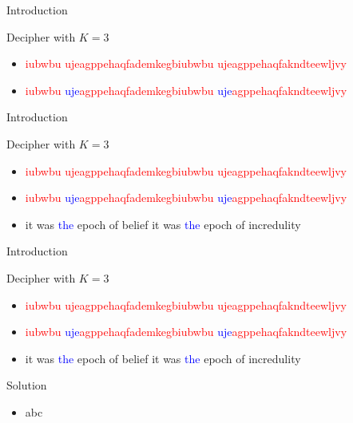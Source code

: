\documentclass{beamer}
\begin{document}
\begin{frame}{Introduction}

\begin{block}{Decipher with $K=3$}
\begin{itemize}
\item \textcolor{red}{iubwbu ujeagppehaqfademkegbiubwbu ujeagppehaqfakndteewljvy}
\item \textcolor{red}{iubwbu }\textcolor{blue}{uje}\textcolor{red}{agppehaqfademkegbiubwbu }\textcolor{blue}{uje}\textcolor{red}{agppehaqfakndteewljvy}
\end{itemize}
\end{block}

\end{frame}
  

\begin{frame}{Introduction}

\begin{block}{Decipher with $K=3$}
\begin{itemize}
\item \textcolor{red}{iubwbu ujeagppehaqfademkegbiubwbu ujeagppehaqfakndteewljvy}
\item \textcolor{red}{iubwbu }\textcolor{blue}{uje}\textcolor{red}{agppehaqfademkegbiubwbu }\textcolor{blue}{uje}\textcolor{red}{agppehaqfakndteewljvy}
\item it was \textcolor{blue}{the} epoch of belief it was \textcolor{blue}{the} epoch of incredulity
\end{itemize}
\end{block}

\end{frame}


\begin{frame}{Introduction}

\begin{block}{Decipher with $K=3$}
\begin{itemize}
\item \textcolor{red}{iubwbu ujeagppehaqfademkegbiubwbu ujeagppehaqfakndteewljvy}
\item \textcolor{red}{iubwbu }\textcolor{blue}{uje}\textcolor{red}{agppehaqfademkegbiubwbu }\textcolor{blue}{uje}\textcolor{red}{agppehaqfakndteewljvy}
\item it was \textcolor{blue}{the} epoch of belief it was \textcolor{blue}{the} epoch of incredulity
\end{itemize}
\end{block}

\begin{block}{Solution}
\begin{itemize}
\item abc
\end{itemize}
\end{block}

\end{frame}
\end{document}
